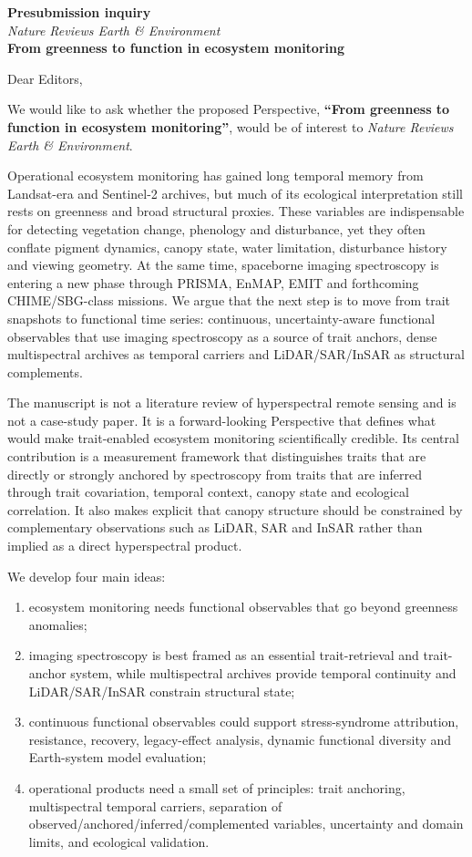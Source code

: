 \documentclass[11pt]{article}
\newcommand{\journal}{\textit{Nature Reviews Earth \& Environment}}
\newcommand{\papertitle}{From greenness to function in ecosystem monitoring}
\begin{document}
\begin{center}
{\Large \textbf{Presubmission inquiry}}\\[0.25em]
{\large \journal}\\[0.45em]
{\large \textbf{\papertitle}}
\end{center}

Dear Editors,

We would like to ask whether the proposed Perspective, \textbf{``\papertitle''}, would be of interest to \journal.

Operational ecosystem monitoring has gained long temporal memory from Landsat-era and Sentinel-2 archives, but much of its ecological interpretation still rests on greenness and broad structural proxies. These variables are indispensable for detecting vegetation change, phenology and disturbance, yet they often conflate pigment dynamics, canopy state, water limitation, disturbance history and viewing geometry. At the same time, spaceborne imaging spectroscopy is entering a new phase through PRISMA, EnMAP, EMIT and forthcoming CHIME/SBG-class missions. We argue that the next step is to move from trait snapshots to functional time series: continuous, uncertainty-aware functional observables that use imaging spectroscopy as a source of trait anchors, dense multispectral archives as temporal carriers and LiDAR/SAR/InSAR as structural complements.

The manuscript is not a literature review of hyperspectral remote sensing and is not a case-study paper. It is a forward-looking Perspective that defines what would make trait-enabled ecosystem monitoring scientifically credible. Its central contribution is a measurement framework that distinguishes traits that are directly or strongly anchored by spectroscopy from traits that are inferred through trait covariation, temporal context, canopy state and ecological correlation. It also makes explicit that canopy structure should be constrained by complementary observations such as LiDAR, SAR and InSAR rather than implied as a direct hyperspectral product.

We develop four main ideas:

\begin{enumerate}
\item ecosystem monitoring needs functional observables that go beyond greenness anomalies;
\item imaging spectroscopy is best framed as an essential trait-retrieval and trait-anchor system, while multispectral archives provide temporal continuity and LiDAR/SAR/InSAR constrain structural state;
\item continuous functional observables could support stress-syndrome attribution, resistance, recovery, legacy-effect analysis, dynamic functional diversity and Earth-system model evaluation;
\item operational products need a small set of principles: trait anchoring, multispectral temporal carriers, separation of observed/anchored/inferred/complemented variables, uncertainty and domain limits, and ecological validation.
\end{enumerate}
\end{document}
